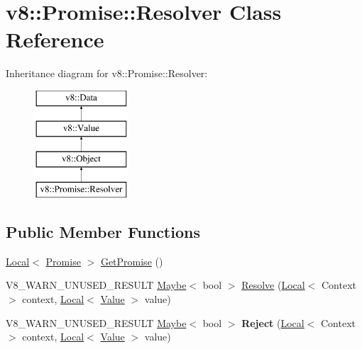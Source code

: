 \hypertarget{classv8_1_1Promise_1_1Resolver}{}\section{v8\+:\+:Promise\+:\+:Resolver Class Reference}
\label{classv8_1_1Promise_1_1Resolver}
Inheritance diagram for v8\+:\+:Promise\+:\+:Resolver\+:\begin{figure}[H]
\begin{center}
\leavevmode
\includegraphics[height=4.000000cm]{classv8_1_1Promise_1_1Resolver}
\end{center}
\end{figure}
\subsection*{Public Member Functions}
\begin{DoxyCompactItemize}
\item 
\mbox{\hyperlink{classv8_1_1Local}{Local}}$<$ \mbox{\hyperlink{classv8_1_1Promise}{Promise}} $>$ \mbox{\hyperlink{classv8_1_1Promise_1_1Resolver_a41fd1ffef546a62e363a639935fc8ae3}{Get\+Promise}} ()
\item 
V8\+\_\+\+W\+A\+R\+N\+\_\+\+U\+N\+U\+S\+E\+D\+\_\+\+R\+E\+S\+U\+LT \mbox{\hyperlink{classv8_1_1Maybe}{Maybe}}$<$ bool $>$ \mbox{\hyperlink{classv8_1_1Promise_1_1Resolver_a7e5ba9aab1a36574fdfad04da9a543a5}{Resolve}} (\mbox{\hyperlink{classv8_1_1Local}{Local}}$<$ Context $>$ context, \mbox{\hyperlink{classv8_1_1Local}{Local}}$<$ \mbox{\hyperlink{classv8_1_1Value}{Value}} $>$ value)
\item 
\mbox{\label{classv8_1_1Promise_1_1Resolver_ad9739bdf891d64a93b288c614bffe8e5}} 
V8\+\_\+\+W\+A\+R\+N\+\_\+\+U\+N\+U\+S\+E\+D\+\_\+\+R\+E\+S\+U\+LT \mbox{\hyperlink{classv8_1_1Maybe}{Maybe}}$<$ bool $>$ {\bfseries Reject} (\mbox{\hyperlink{classv8_1_1Local}{Local}}$<$ Context $>$ context, \mbox{\hyperlink{classv8_1_1Local}{Local}}$<$ \mbox{\hyperlink{classv8_1_1Value}{Value}} $>$ value)
\end{DoxyCompactItemize}
